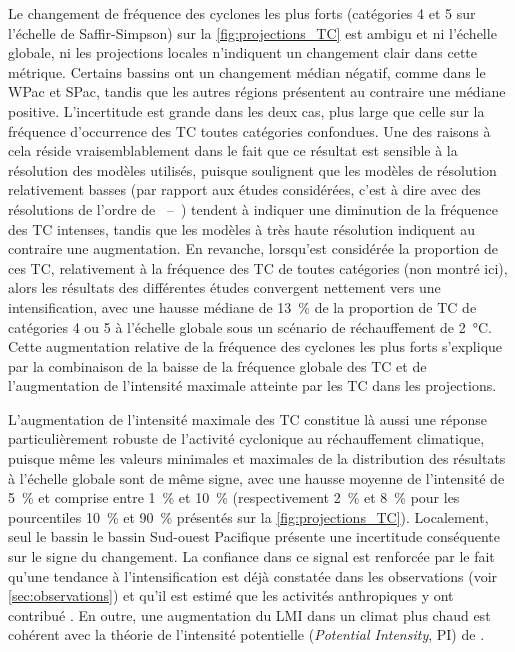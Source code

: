 \documentclass[../main.tex]{subfiles}
\begin{document}
Le changement de fréquence des cyclones les plus forts (catégories 4 et 5 sur l'échelle de Saffir-Simpson) sur la \cref{fig:projections_TC} est ambigu et ni
l'échelle globale, ni les projections locales n'indiquent un changement clair dans cette métrique. Certains bassins ont un changement médian négatif, comme dans
le WPac et SPac, tandis que les autres régions présentent au contraire une médiane positive. L'incertitude est grande dans les deux cas, plus large que celle
sur la fréquence d'occurrence des TC toutes catégories confondues. Une des raisons  à cela réside vraisemblablement dans le fait que ce résultat est sensible à
la résolution des modèles utilisés, puisque \textcite{knutson_tropical_2020} soulignent que les modèles de résolution relativement basses (par rapport aux études
considérées, c'est à dire avec des résolutions de l'ordre de ~--~) tendent à indiquer une diminution de la fréquence des TC intenses, tandis que
les modèles à très haute résolution indiquent au contraire une augmentation. En revanche, lorsqu'est considérée la proportion de ces TC, relativement à la
fréquence des TC de toutes catégories (non montré ici), alors les résultats des différentes études convergent nettement vers une intensification, avec une
hausse médiane de \SI{13}{\percent} de la proportion de TC de catégories 4 ou 5 à l'échelle globale sous un scénario de réchauffement de \SI{2}{\degreeCelsius}.
Cette augmentation relative de la fréquence des cyclones les plus forts s'explique par la combinaison de la baisse de la fréquence globale des TC et de
l'augmentation de l'intensité maximale atteinte par les TC dans les projections.

L'augmentation de l'intensité maximale des TC constitue là aussi une réponse particulièrement robuste de l'activité cyclonique au réchauffement climatique,
puisque même les valeurs minimales et maximales de la distribution des résultats à l'échelle globale sont de même signe, avec une hausse moyenne de l'intensité
de \SI{5}{\percent} et comprise entre \SI{1}{\percent} et \SI{10}{\percent} (respectivement \SI{2}{\percent} et \SI{8}{\percent} pour les pourcentiles
\SI{10}{\percent} et \SI{90}{\percent} présentés sur la \cref{fig:projections_TC}). Localement, seul le bassin le bassin Sud-ouest Pacifique présente une
incertitude conséquente sur le signe du changement. La confiance dans ce signal est renforcée par le fait qu'une tendance à l'intensification est déjà constatée
dans les observations (voir \cref{sec:observations}) et qu'il est estimé que les activités anthropiques y ont contribué \parencite{knutson_tropical_2019}. En
outre, une augmentation du LMI dans un climat plus chaud est cohérent avec la théorie de l'intensité potentielle (\textit{Potential Intensity}, PI) de
\textcite{emanuel_dependence_1987}.
\end{document}
